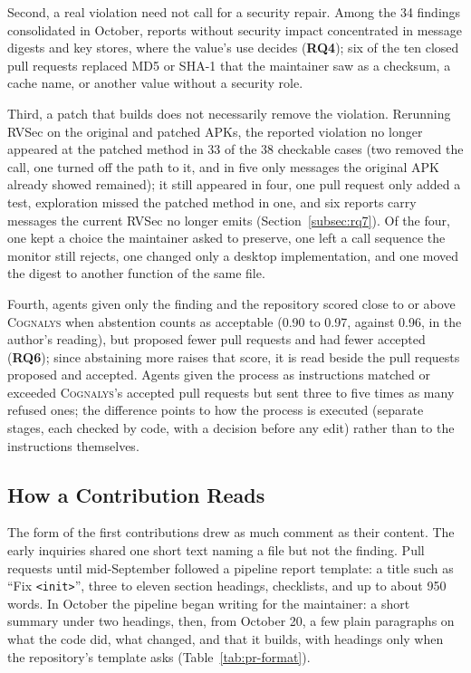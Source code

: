 \documentclass[conference]{IEEEtran}
\newcommand{\system}{\textsc{Cognalys}}
\newcommand{\researchq}[1]{\textbf{RQ#1}}
\begin{document}
Second, a real violation need not call for a security repair. Among the 34
findings consolidated in October, reports without security impact concentrated
in message digests and key stores, where the value's use decides
(\researchq{4}); six of the ten closed pull requests replaced MD5 or SHA-1 that
the maintainer saw as a checksum, a cache name, or another value without a
security role.

Third, a patch that builds does not necessarily remove the violation.
Rerunning RVSec on the original and patched APKs, the reported violation no
longer appeared at the patched method in 33 of the 38 checkable cases (two
removed the call, one turned off the path to it, and in five only messages the
original APK already showed remained); it still appeared in four, one pull
request only added a test, exploration missed the patched method in one, and
six reports carry messages the current RVSec no longer emits
(Section~\ref{subsec:rq7}). Of the four, one kept a choice the maintainer asked
to preserve, one left a call sequence the monitor still rejects, one changed
only a desktop implementation, and one moved the digest to another function of
the same file.

Fourth, agents given only the finding and the repository scored close to or
above \system{} when abstention counts as acceptable (0.90 to 0.97, against
0.96, in the author's reading), but proposed fewer pull requests and had fewer
accepted (\researchq{6}); since abstaining more raises that score, it is read
beside the pull requests proposed and accepted. Agents given the process
as instructions matched or exceeded \system{}'s accepted pull requests but sent
three to five times as many refused ones; the difference points to how the
process is executed (separate stages, each checked by code, with a decision
before any edit) rather than to the instructions themselves.

\subsection{How a Contribution Reads}
\label{subsec:form}

The form of the first contributions drew as much comment as their content. The
early inquiries shared one short text naming a file but not the finding. Pull
requests until mid-September followed a pipeline report template: a title such
as ``Fix \texttt{<init>}'', three to eleven section headings, checklists, and up
to about 950 words. In October the pipeline began writing for the maintainer:
a short summary under two headings, then, from October 20, a few plain
paragraphs on what the code did, what changed, and that it builds, with
headings only when the repository's template asks (Table~\ref{tab:pr-format}).
\end{document}
